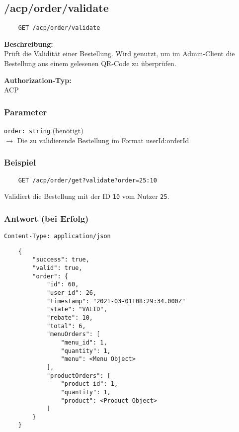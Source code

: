 \subsection{/acp/order/validate}
\label{validateOrder}

\begin{lstlisting}
    GET /acp/order/validate
\end{lstlisting}

\textbf{Beschreibung:} \\
Prüft die Validität einer Bestellung. Wird genutzt, um im Admin-Client die Bestellung aus einem gelesenen QR-Code zu überprüfen.

\textbf{Authorization-Typ:} \\
ACP

\subsubsection{Parameter}

\lstinline{order: string} (benötigt) \\
$\rightarrow$ Die zu validierende Bestellung im Format \glqq userId:orderId\grqq

\subsubsection{Beispiel}

\begin{lstlisting}
    GET /acp/order/get?validate?order=25:10
\end{lstlisting}

Validiert die Bestellung mit der ID \lstinline{10} vom Nutzer \lstinline{25}.

\subsubsection{Antwort (bei Erfolg)}

\lstinline{Content-Type: application/json}
\begin{lstlisting}
    {
        "success": true, 
        "valid": true,
        "order": {
            "id": 60,
            "user_id": 26,
            "timestamp": "2021-03-01T08:29:34.000Z"
            "state": "VALID",
            "rebate": 10,
            "total": 6,
            "menuOrders": [
                "menu_id": 1,
                "quantity": 1,
                "menu": <Menu Object>
            ],
            "productOrders": [
                "product_id": 1,
                "quantity": 1,
                "product": <Product Object>
            ]
        }
    }
\end{lstlisting}

